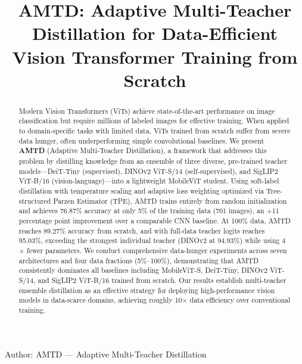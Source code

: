 \documentclass[journal]{IEEEtran}
\begin{document}
\title{AMTD: Adaptive Multi-Teacher Distillation for Data-Efficient \\
Vision Transformer Training from Scratch}

\author{
}

%
{Author: AMTD --- Adaptive Multi-Teacher Distillation}

\maketitle

\begin{abstract}
Modern Vision Transformers (ViTs) achieve state-of-the-art performance on image classification
but require millions of labeled images for effective training. When applied to domain-specific
tasks with limited data, ViTs trained from scratch suffer from severe data hunger, often
underperforming simple convolutional baselines. We present \textbf{AMTD} (Adaptive Multi-Teacher
Distillation), a framework that addresses this problem by distilling knowledge from an ensemble
of three diverse, pre-trained teacher models---DeiT-Tiny (supervised), DINOv2 ViT-S/14
(self-supervised), and SigLIP2 ViT-B/16 (vision-language)---into a lightweight MobileViT student.
Using soft-label distillation with temperature scaling and adaptive loss weighting optimized via
Tree-structured Parzen Estimator (TPE), AMTD trains entirely from random initialization and
achieves 76.87\% accuracy at only 5\% of the training data (701 images), an +11 percentage point
improvement over a comparable CNN baseline. At 100\% data, AMTD reaches 89.27\% accuracy from
scratch, and with full-data teacher logits reaches 95.03\%, exceeding the strongest individual
teacher (DINOv2 at 94.93\%) while using 4$\times$ fewer parameters. We conduct comprehensive
data-hunger experiments across seven architectures and four data fractions (5\%--100\%),
demonstrating that AMTD consistently dominates all baselines including MobileViT-S, DeiT-Tiny,
DINOv2 ViT-S/14, and SigLIP2 ViT-B/16 trained from scratch. Our results establish multi-teacher
ensemble distillation as an effective strategy for deploying high-performance vision models in
data-scarce domains, achieving roughly 10$\times$ data efficiency over conventional training.
\end{abstract}
\end{document}
